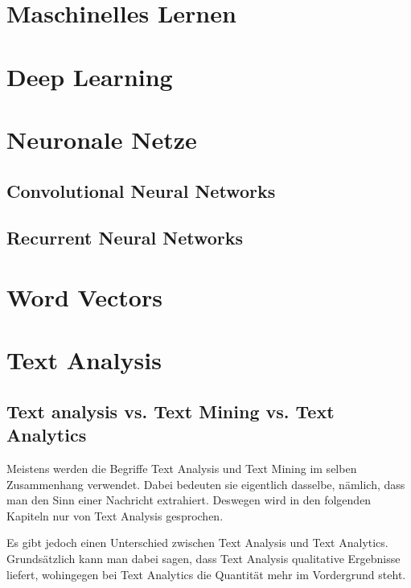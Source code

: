 \section{Maschinelles Lernen}


\section{Deep Learning}


\section{Neuronale Netze}
\subsection{Convolutional Neural Networks}

\subsection{Recurrent Neural Networks}


\section{Word Vectors}


\section{Text Analysis}

\subsection{Text analysis vs. Text Mining vs. Text Analytics}

Meistens werden die Begriffe Text Analysis und Text Mining im selben Zusammenhang verwendet.
Dabei bedeuten sie eigentlich dasselbe, nämlich, dass man den Sinn einer Nachricht extrahiert.
Deswegen wird in den folgenden Kapiteln nur von Text Analysis gesprochen.

Es gibt jedoch einen Unterschied zwischen Text Analysis und Text Analytics.
Grundsätzlich kann man dabei sagen, dass Text Analysis qualitative Ergebnisse liefert, wohingegen bei Text Analytics die Quantität mehr im Vordergrund steht.\cite{textAnalysisMonkeylearn, machineLearningTextAnalysis}

